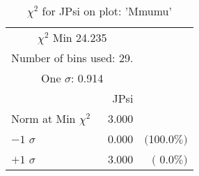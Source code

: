  \begin{table}[h!]\centering
 {\small{
 \begin{tabular}{||l||r||r||}
 \hline
 \hline
\multicolumn{2}{||c||}{$\chi^{2}$ Min  24.235} & \\
 \multicolumn{2}{||c||}{Number of bins used:   29.} & \\
\multicolumn{2}{||c||}{One $\sigma$:    0.914} & \\
 \hline
 \hline
    & JPsi & \\
Norm at Min $\chi^{2}$  &   3.000 & \\
$-1$ $\sigma$ &   0.000  &  $($100.0$\%)$  \\
$+1$ $\sigma$ &   3.000  &  $($  0.0$\%)$  \\
 \hline
 \hline
 \end{tabular}
 \caption{$\chi^{2}$ for JPsi on plot: 'Mmumu'}
 \label{tab-chijpsi}
 }}
 \end{table}
 \endinput
